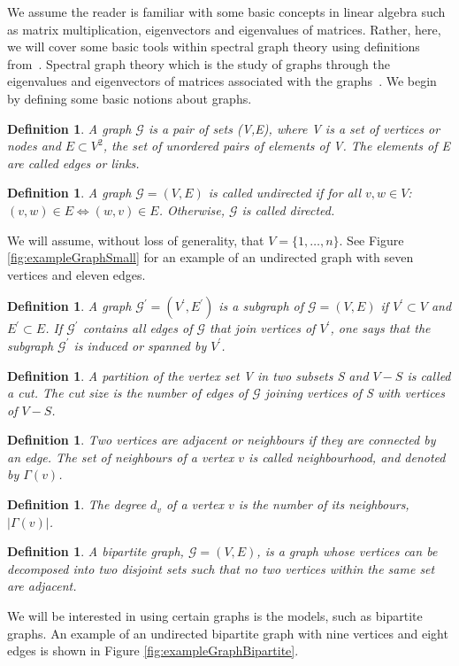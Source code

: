 \documentclass[12pt]{article}
\numberwithin{equation}{section}
\newtheorem{definition}[theorem]{Definition}
\begin{document}
We assume the reader is familiar with some basic concepts in linear algebra such as matrix multiplication, eigenvectors and eigenvalues of matrices. Rather, here, we will cover some basic tools within spectral graph theory using definitions from~\cite{For10,New06a, Spi12, Spi07}. Spectral graph theory which is the study of graphs through the eigenvalues and eigenvectors of matrices associated with the graphs~\cite{Spi12}. We begin by defining some basic notions about graphs.
\begin{definition}
\label{def:graph}
	A graph $\mathcal{G}$ is a pair of sets (V,E), where V is a set of vertices or nodes and $E \subset V^{2}$, the set of unordered pairs of elements of V. The elements of E are called edges or links.
\end{definition}
\begin{definition}
\label{def:undirectedGraph}
	A graph $\mathcal{G} = (V,E)$ is called undirected if for all $v,w \in V$: $(v,w) \in E \iff (w,v) \in E$. Otherwise, $\mathcal{G}$ is called directed.
\end{definition}
We will assume, without loss of generality, that $V = \{1,\dots,n\}$. See Figure \ref{fig:exampleGraphSmall} for an example of an undirected graph with seven vertices and eleven edges.
\begin{definition}
\label{def:subGraph}
	A graph $\mathcal{G}^{\prime} = (V^{\prime},E^{\prime})$ is a subgraph of $\mathcal{G} = (V,E)$ if $V^{\prime} \subset V$ and $E^{\prime} \subset E$. If $\mathcal{G}^{\prime}$ contains all edges of $\mathcal{G}$ that join vertices of $V^{\prime}$, one says that the subgraph $\mathcal{G}^{\prime}$ is induced or spanned by $V^{\prime}$.
\end{definition}
\begin{definition}
\label{def:cuts}
	A partition of the vertex set V in two subsets S and $V-S$ is called a cut. The cut size is the number of edges of $\mathcal{G}$ joining vertices of S with vertices of $V-S$.
\end{definition}
\begin{definition}
\label{def:neighbourhoodNode}
	Two vertices are adjacent or neighbours if they are connected by an edge. The set of neighbours of a vertex $v$ is called neighbourhood, and denoted by $\Gamma(v)$.
\end{definition}
\begin{definition}
\label{def:degreeNode}
	The degree $d_{v}$ of a vertex $v$ is the number of its neighbours, $\left\vert{\Gamma(v)}\right\vert$.
\end{definition}
\begin{definition}
\label{def:bipartiteGraph}
	A bipartite graph, $\mathcal{G} = (V,E)$, is a graph whose vertices can be decomposed into two disjoint sets such that no two vertices within the same set are adjacent.
\end{definition}
We will be interested in using certain graphs is the models, such as bipartite graphs. An example of an undirected bipartite graph with nine vertices and eight edges is shown in Figure \ref{fig:exampleGraphBipartite}.
\end{document}
